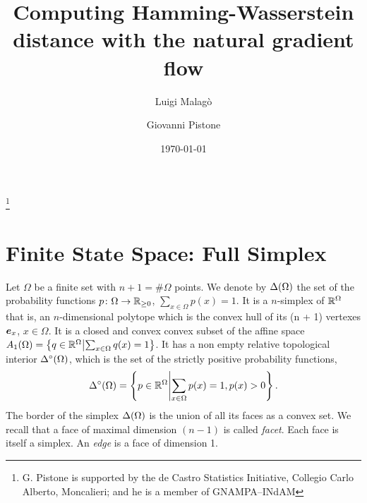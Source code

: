 \documentclass[12pt,a4paper]{amsart}
\begin{document}
\title[Hamming-Wasserstein]{Computing Hamming-Wasserstein distance with the natural gradient flow}

\author[L. Malag\`o]{Luigi Malag\`o}
\address{L. Malag\`o: Romanian Institute of Science and Technology - RIST, Str. Virgil Fulicea nr. 17, 400022 Cluj-Napoca, Romania}

\author[G. Pistone]{Giovanni Pistone}
\address{G. Pistone: de Castro Statistics, Collegio Carlo Alberto, Piazza Vincenzo Arbarello 8, 10122 Torino, Italy}

\thanks{G. Pistone is supported by the de Castro Statistics Initiative, Collegio Carlo Alberto, Moncalieri; and he is a member of GNAMPA--INdAM} 

\date{\today}

\maketitle

\tableofcontents



\section{Finite State Space: Full Simplex}
\label{sec:1a}
%
Let $\Omega$ be a finite set with $n+1 = \#\Omega$ points. We denote by $\Delta(\Omega)$ the set of the probability functions $p \colon \Omega \to \mathbb{R}_{\ge 0}$, $\sum_{x\in\Omega} p(x) = 1$. It is a $n$-simplex of $\mathbb R^\Omega$ that is, an $n$-dimensional polytope which is the convex hull of its (n + 1) vertexes $\bm e_x$, $x \in \Omega$. It is a closed and convex convex subset of the affine space $A_1(\Omega) = \left\{ q \in \mathbb R^\Omega \middle| \sum_{x\in\Omega} q(x) = 1 \right\}$. It has a non empty relative topological interior $\Delta^\circ(\Omega)$, which is the set of the strictly positive probability functions,
%
\begin{equation*}
 \Delta^\circ(\Omega) = \left\{ p \in \mathbb R^{\Omega} \middle| \sum_{x\in\Omega} p(x) = 1, p(x) > 0 \right\}.
\end{equation*}
%
The border of the simplex $\Delta(\Omega)$ is the union of all its faces as a convex set. We recall that  a face of maximal dimension $(n-1)$ is called \emph{facet}. Each face is itself a simplex. An \emph{edge} is a face of dimension 1.
\end{document}
